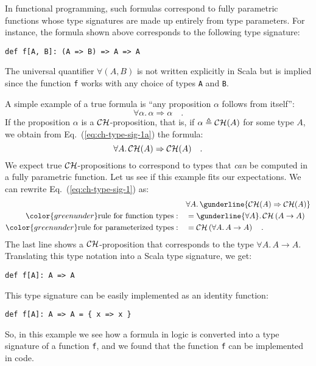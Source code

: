 In functional programming, such formulas correspond to fully parametric
functions whose type signatures are made up entirely from type parameters.
For instance, the formula shown above corresponds to the following
type signature:
\begin{lstlisting}
def f[A, B]: (A => B) => A => A
\end{lstlisting}
The universal quantifier $\forall(A,B)$ is not written explicitly
in Scala but is implied since the function \lstinline!f! works with
any choice of types \lstinline!A! and \lstinline!B!.

A simple example of a true formula is \textsf{``}any proposition $\alpha$
follows from itself\textsf{''}:
\begin{equation}
\forall\alpha.\,\alpha\Rightarrow\alpha\quad.\label{eq:ch-type-sig-1a}
\end{equation}
If the proposition $\alpha$ is a ${\cal CH}$-proposition, that is,
if $\alpha\triangleq{\cal CH}(A)$ for some type $A$, we obtain from
Eq.~(\ref{eq:ch-type-sig-1a}) the formula:
\begin{equation}
\forall A.\,{\cal CH}(A)\Rightarrow{\cal CH}(A)\quad.\label{eq:ch-type-sig-1}
\end{equation}
We expect true ${\cal CH}$-propositions to correspond to types that
\emph{can} be computed in a fully parametric function. Let us see
if this example fits our expectations. We can rewrite Eq.~(\ref{eq:ch-type-sig-1})
as:
\begin{align*}
 & \forall A.\,\gunderline{{\cal CH}(A)\Rightarrow{\cal CH}(A)}\\
{\color{greenunder}\text{rule for function types}:}\quad & =\gunderline{\forall A}.\,{\cal CH}\left(A\rightarrow A\right)\\
{\color{greenunder}\text{rule for parameterized types}:}\quad & ={\cal CH}\left(\forall A.\,A\rightarrow A\right)\quad.
\end{align*}
The last line shows a ${\cal CH}$-proposition that corresponds to
the type $\forall A.\,A\rightarrow A$. Translating this type notation
into a Scala type signature, we get:
\begin{lstlisting}
def f[A]: A => A
\end{lstlisting}
This type signature can be easily implemented as an identity function:
\begin{lstlisting}
def f[A]: A => A = { x => x }
\end{lstlisting}
So, in this example we see how a formula in logic is converted into
a type signature of a function \lstinline!f!, and we found that the
function \lstinline!f! can be implemented in code.

